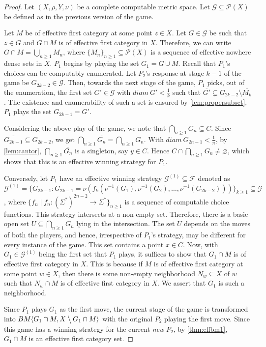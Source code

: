 \documentclass[a4paper,UKenglish,autoref,thm-restate,numberwithinsect]{lipics-v2021}
\begin{document}
\begin{proof}
	Let $(X,\rho,Y,\nu)$ be a complete computable metric space. Let $\mathcal{G}\subseteq\mathcal{P}(X)$ be defined as in the previous version of the game.
	
	Let $M$ be of effective first category at some point $z\in X$. Let $G\in\mathcal{G}$ be such that $z\in G$ and $G\cap M$ is of effective first category in $X$. Therefore, we can write $G\cap M=\bigcup_{n\geq1}M_n$, where  $\{M_n\}_{n\geq1}\subseteq\mathcal{P}(X)$ is a sequence of effective nowhere dense sets in $X$. $P_1$ begins by playing the set $G_1=G\cup M$. Recall that $P_1$'s choices can be computably enumerated. Let $P_2$'s response at stage $k-1$ of the game be $G_{2k-2}\in\mathcal{G}$. Then, towards the next stage of the game, $P_1$ picks, out of the enumeration, the first set $G'\in\mathcal{G}$ with $diam\ G'<\frac{1}{k}$ such that $\overline{G'}\subsetneq G_{2k-2}\setminus\overline{M_k}$. The existence and enumerability of such a set is ensured by \cref{lem:propersubset}. $P_1$ plays the set $G_{2k-1}=G'$. 
	
	Considering the above play of the game, we note that $\bigcap_{n\geq1}G_n\subseteq C$. Since $\overline{G_{2k-1}}\subseteq G_{2k-2}$, we get $\bigcap_{n\geq1}\overline{G_n}=\bigcap_{n\geq1}G_n$. With $diam\ G_{2n-1}<\frac{1}{n}$, by \cref{lem:cantor}, $\bigcap_{n\geq1}\overline{G_n}$ is a singleton, say $y\in C$. Hence $C\cap\bigcap_{n\geq1}G_n\neq\varnothing$, which shows that this is an effective winning strategy for $P_1$. 
	
	Conversely, let $P_1$ have an effective winning strategy $\mathcal{G}^{(1)}\subseteq\mathcal{F}$ denoted as $\mathcal{G}^{(1)}=\{G_{2k-1}:G_{2k-1}=\nu(f_k\left(\nu^{-1}(G_1),\nu^{-1}(G_2),\ldots,\nu^{-1}(G_{2k-2})\right))\}_{k\geq1}\subseteq\mathcal{G}$, where $\{f_n\mid f_n:(\Sigma^*)^{2n-2}\to\Sigma^*\}_{n\geq1}$ is a sequence of computable choice functions. This strategy intersects at a non-empty set. Therefore, there is a basic open set $U\subseteq\bigcap_{n\geq1}G_n$ lying in the intersection. The set $U$ depends on the moves of both the players, and hence, irrespective of $P_1$'s strategy, may be different for every instance of the game. This set contains a point $x\in C$. Now, with $G_1\in\mathcal{G}^{(1)}$ being the first set that $P_1$ plays, it suffices to show that $G_1\cap M$ is of effective first category in $X$. This is because if $M$ is of effective first category at some point $w\in X$, then there is some non-empty neighborhood $N_w\subseteq X$ of $w$ such that $N_w\cap M$ is of effective first category in $X$. We assert that $G_1$ is such a neighborhood. 
	
	Since $P_1$ plays $G_1$ as the first move, the current stage of the game is transformed into $BM\langle G_1\cap M,X\mathbin{\big\backslash}G_1\cap M\rangle$ with the original $P_2$ playing the first move. Since this game has a winning strategy for the current \textit{new} $P_2$, by \cref{thm:effbm1}, $G_1\cap M$ is an effective first category set. 
\end{proof}
\end{document}
